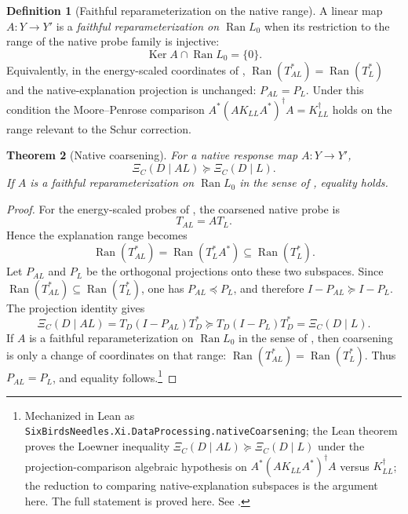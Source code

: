 \documentclass[11pt]{article}
\DeclareMathOperator{\Ran}{Ran}
\DeclareMathOperator{\Ker}{Ker}
\newcommand{\preceqq}{\preceq}
\newtheorem{theorem}{Theorem}[section]
\theoremstyle{definition}
\newtheorem{definition}[theorem]{Definition}
\begin{document}
\begin{definition}[Faithful reparameterization on the native range]\label{def:xi:faithful-reparameterization}
A linear map \(A\colon Y\to Y'\) is a \emph{faithful
reparameterization on \(\Ran L_0\)} when its restriction to
the range of the native probe family is injective:
\[
  \Ker A\cap \Ran L_0=\{0\}.
\]
Equivalently, in the energy-scaled coordinates of
,
\(\Ran(T_{AL}^*)=\Ran(T_L^*)\) and the native-explanation
projection is unchanged: \(P_{AL}=P_L\).  Under this
condition the Moore--Penrose comparison
\(A^*(AK_{LL}A^*)^{\dagger}A=K_{LL}^{\dagger}\) holds on the
range relevant to the Schur correction.
\end{definition}

\begin{theorem}[Native coarsening]\label{thm:xi:native-coarsening}
For a native response map \(A\colon Y\to Y'\),
\[
  \boxed{\Xi_C(D\mid AL)\succeq \Xi_C(D\mid L).}
\]
If \(A\) is a faithful reparameterization on \(\Ran L_0\)
in the sense of ,
equality holds.
\end{theorem}

\begin{proof}
For the energy-scaled probes of , the coarsened native
probe is
\[
  T_{AL}=A T_L.
\]
Hence the explanation range becomes
\[
  \Ran(T_{AL}^*)=\Ran(T_L^*A^*)\subseteq \Ran(T_L^*).
\]
Let \(P_{AL}\) and \(P_L\) be the orthogonal projections onto these two
subspaces.  Since \(\Ran(T_{AL}^*)\subseteq\Ran(T_L^*)\), one has
\(P_{AL}\preceqq P_L\), and therefore \(I-P_{AL}\succeq I-P_L\).  The
projection identity gives
\[
  \Xi_C(D\mid AL)
  =
  T_D(I-P_{AL})T_D^*
  \succeq
  T_D(I-P_L)T_D^*
  =
  \Xi_C(D\mid L).
\]
If \(A\) is a faithful reparameterization on \(\Ran L_0\) in the sense of
, then coarsening is only a
change of coordinates on that range: \(\Ran(T_{AL}^*)=\Ran(T_L^*)\).  Thus
\(P_{AL}=P_L\), and equality follows.\footnote{Mechanized in Lean as \texttt{SixBirdsNeedles.Xi.DataProcessing.nativeCoarsening}; the Lean theorem proves the Loewner inequality \(\Xi_C(D\mid AL)\succeq \Xi_C(D\mid L)\) under the projection-comparison algebraic hypothesis on \(A^*(AK_{LL}A^*)^\dagger A\) versus \(K_{LL}^\dagger\); the reduction to comparing native-explanation subspaces is the argument here.  The full statement is proved here.  See .}
\end{proof}
\end{document}
